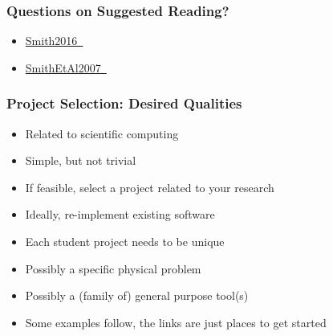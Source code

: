 \documentclass[t,12pt,numbers,fleqn]{beamer}
\begin{document}

\begin{frame}
\frametitle{Questions on Suggested Reading?}

\begin {itemize}

\item \href{https://gitlab.cas.mcmaster.ca/smiths/cas741/blob/master/ReferenceMaterial/SoftEngForScienceBook.pdf}{Smith2016~\cite{Smith2016}}
\item \href{https://gitlab.cas.mcmaster.ca/smiths/cas741/blob/master/ReferenceMaterial/SmithLaiAndKhedri2007fulltext.pdf}{SmithEtAl2007~\cite{SmithEtAl2007}}

\end{itemize}

\end{frame}


\begin{frame}
\frametitle{Project Selection: Desired Qualities}
\begin{itemize}
\item Related to scientific computing
\item Simple, but not trivial
\item If feasible, select a project related to your research
\item Ideally, re-implement existing software
\item Each student project needs to be unique
\item Possibly a specific physical problem
\item Possibly a (family of) general purpose tool(s)
\item Some examples follow, the links are just places to get started
\end{itemize}
\end{frame}

\end{document}
